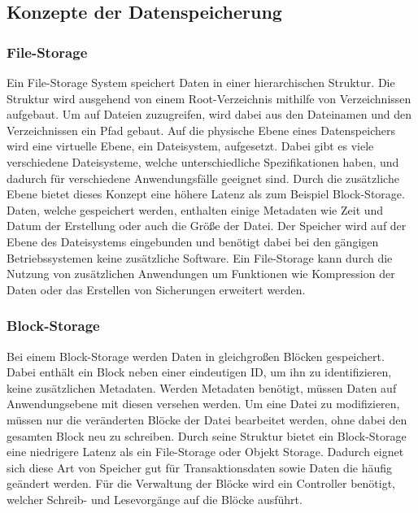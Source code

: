 \subsection{Konzepte der Datenspeicherung}
\subsubsection{File-Storage}
Ein File-Storage System speichert Daten in einer hierarchischen Struktur. Die Struktur wird ausgehend von einem Root-Verzeichnis mithilfe von Verzeichnissen aufgebaut. Um auf Dateien zuzugreifen, wird dabei aus den Dateinamen und den Verzeichnissen ein Pfad gebaut. Auf die physische Ebene eines Datenspeichers wird eine virtuelle Ebene, ein Dateisystem, aufgesetzt. Dabei gibt es viele verschiedene Dateisysteme, welche unterschiedliche Spezifikationen haben, und dadurch für verschiedene Anwendungsfälle geeignet sind.
Durch die zusätzliche Ebene bietet dieses Konzept eine höhere Latenz als zum Beispiel Block-Storage. Daten, welche gespeichert werden, enthalten einige Metadaten wie Zeit und Datum der Erstellung oder auch die Größe der Datei.
Der Speicher wird auf der Ebene des Dateisystems eingebunden und benötigt dabei bei den gängigen Betriebssystemen keine zusätzliche Software. Ein File-Storage kann durch die Nutzung von zusätzlichen Anwendungen um Funktionen wie Kompression der Daten oder das Erstellen von Sicherungen erweitert werden.

\subsubsection{Block-Storage}
Bei einem Block-Storage werden Daten in gleichgroßen Blöcken gespeichert. Dabei enthält ein Block neben einer eindeutigen ID, um ihn zu identifizieren, keine zusätzlichen Metadaten. Werden Metadaten benötigt, müssen Daten auf Anwendungsebene mit diesen versehen werden. Um eine Datei zu modifizieren, müssen nur die veränderten Blöcke der Datei bearbeitet werden, ohne dabei den gesamten Block neu zu schreiben. Durch seine Struktur bietet ein Block-Storage eine niedrigere Latenz als ein File-Storage oder Objekt Storage. Dadurch eignet sich diese Art von Speicher gut für Transaktionsdaten sowie Daten die häufig geändert werden. 
Für die Verwaltung der Blöcke wird ein Controller benötigt, welcher Schreib- und Lesevorgänge auf die Blöcke ausführt.

